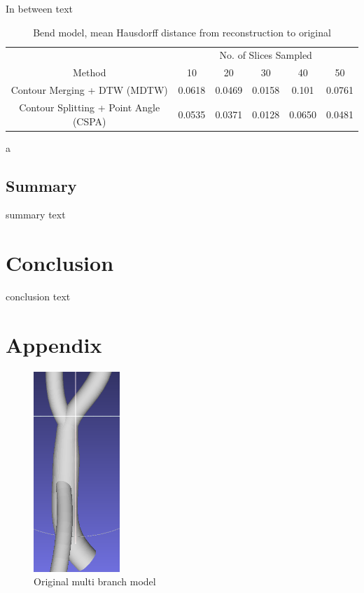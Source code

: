 \documentclass[11p, titlepage]{article}
\begin{document}
In between text

\begin{table}[h]
\begin{tabular}{ | c | c | c | c | c | c | }
\hline
& \multicolumn{5}{c|}{No. of Slices Sampled} \\
\cline{2-6}
Method & 10 & 20 & 30 & 40 & 50 \\
\hline
Contour Merging + DTW (MDTW) & 0.0618 & 0.0469 & 0.0158 & 0.101 & 0.0761 \\
Contour Splitting + Point Angle (CSPA) & 0.0535 & 0.0371 & 0.0128 & 0.0650 & 0.0481 \\
\hline
\end{tabular}
\caption{Bend model, mean Hausdorff distance from reconstruction to original}
\label{table:bend_reverse}
\end{table}

a

\subsection{Summary}

summary text

\section{Conclusion}

conclusion text

\pagebreak



\section{Appendix}

\begin{figure}[h]
\centering
\includegraphics[width=0.29\textwidth]{mb}
\caption{Original multi branch model\label{fig:model}}
\end{figure}
\end{document}
